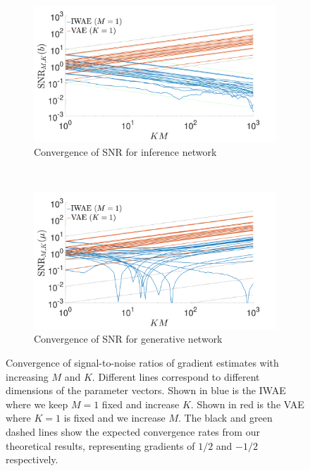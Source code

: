 \begin{figure}[t]
	\centering
	\begin{subfigure}[b]{0.4\textwidth}
		\centering
		\includegraphics[width=\textwidth]{figures/tighter_bounds/b_conv}
		\caption{\vspace{-6pt} Convergence of \gls{SNR} for inference network \label{fig:snr/b}}
	\end{subfigure}
~~~~~~~~~~~~~~
	\begin{subfigure}[b]{0.4\textwidth}
		\centering
		\includegraphics[width=\textwidth]{figures/tighter_bounds/mu_conv}
		\caption{\vspace{-6pt} Convergence of \gls{SNR} for generative network\label{fig:snr/mu}}
	\end{subfigure}
	\caption{Convergence of signal-to-noise ratios of gradient estimates with increasing $M$ and $K$.
		Different lines correspond to different
		dimensions of the parameter vectors.
		Shown in blue is the \gls{IWAE} where we keep $M=1$ fixed and increase $K$.  
		Shown in red is the \gls{VAE} where $K=1$ is fixed and we increase $M$. 
		The black and green dashed lines show the expected convergence rates from our theoretical results, 
		representing gradients of $1/2$ and $-1/2$ respectively.  
		\vspace{-12pt}
		\label{fig:snr/K_conv}}
\end{figure}

